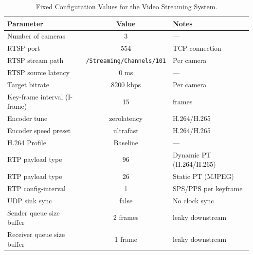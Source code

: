 \begin{table}[H]
    \centering
    \caption{Fixed Configuration Values for the Video Streaming System.}
    \label{tab:fixed_values}
    \begin{tabular}{|l|c|l|}
    \hline
    \textbf{Parameter} & 
    \textbf{Value} & 
    \textbf{Notes} \\
    \hline
    Number of cameras   & 3 & --- \\
    \hline
    RTSP port           & 554 & TCP connection \\
    \hline
    RTSP stream path    & \texttt{/Streaming/Channels/101} & Per camera \\
    \hline
    RTSP source latency & 0 ms & --- \\
    \hline
    Target bitrate      & 8200 kbps & Per camera \\
    \hline
    Key-frame interval (I-frame)  & 15 & frames \\
    \hline
    Encoder tune & zerolatency & H.264/H.265 \\
    \hline
    Encoder speed preset & ultrafast & H.264/H.265 \\
    \hline
    H.264 Profile & Baseline & --- \\
    \hline
    RTP payload type & 96 & Dynamic PT (H.264/H.265) \\
    \hline
    RTP payload type & 26 & Static PT (MJPEG)  \\
    \hline
    RTP config-interval & 1 & SPS/PPS per keyframe \\
    \hline
    UDP sink sync & false & No clock sync \\
    \hline
    Sender queue size buffer & 2 frames & leaky downstream \\
    \hline
    Receiver queue size buffer & 1 frame & leaky downstream \\
    \hline
    \end{tabular}
\end{table}

